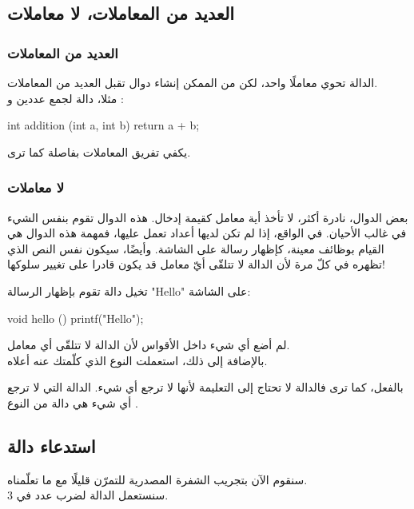 \subsection{العديد من المعاملات، لا معاملات}

\subsubsection{العديد من المعاملات}

الدالة
تحوي معاملًا واحد، لكن من الممكن إنشاء دوال تقبل العديد من المعاملات.\\
مثلا، دالة 
لجمع عددين
و 
:

\begin{Csource}
int addition (int a, int b)
{
	return a + b;
}
\end{Csource}

يكفي تفريق المعاملات بفاصلة كما ترى.

\subsubsection{لا معاملات}

بعض الدوال، نادرة أكثر، لا تأخذ أية معامل كقيمة إدخال. هذه الدوال تقوم بنفس الشيء في غالب الأحيان. في الواقع، إذا لم تكن لديها أعداد تعمل عليها، فمهمة هذه الدوال هي القيام بوظائف معينة، كإظهار رسالة على الشاشة. وأيضًا، سيكون نفس النص الذي تظهره في كلّ مرة لأن الدالة لا تتلقّى أيّ معامل قد يكون قادرا على تغيير سلوكها!

تخيل دالة
تقوم بإظهار الرسالة
"\textenglish{Hello}"
على الشاشة:

\begin{Csource}
void hello ()
{
	printf("Hello");
}
\end{Csource}

لم أضع أي شيء داخل الأقواس لأن الدالة لا تتلقّى أي معامل.\\
بالإضافة إلى ذلك، استعملت النوع 
الذي كلّمتك عنه أعلاه.

بالفعل، كما ترى فالدالة لا تحتاج إلى التعليمة 
لأنها لا ترجع أي شيء. الدالة التي لا ترجع أي شيء هي دالة من النوع
.

\subsection{استدعاء دالة}

سنقوم الآن بتجريب الشفرة المصدرية للتمرّن قليلًا مع ما تعلّمناه.\\
سنستعمل الدالة 
لضرب عدد في 3.

